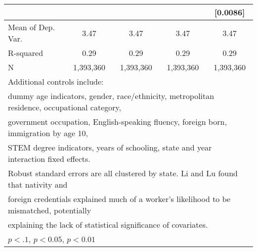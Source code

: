 \begin{table}[htbp]
\begin{tabular}{l*{4}{c}}
                    &                     &                     &                     &    [0.0086]         \\
\midrule
Mean of Dep. Var.   &        3.47         &        3.47         &        3.47         &        3.47         \\
R-squared           &        0.29         &        0.29         &        0.29         &        0.29         \\
N                   &   1,393,360         &   1,393,360         &   1,393,360         &   1,393,360         \\
\bottomrule
\multicolumn{5}{l}{\footnotesize Additional controls include:}\\
\multicolumn{5}{l}{\footnotesize dummy age indicators, gender, race/ethnicity, metropolitan residence, occupational category,}\\
\multicolumn{5}{l}{\footnotesize government occupation, English-speaking fluency, foreign born, immigration by age 10,}\\
\multicolumn{5}{l}{\footnotesize STEM degree indicators, years of schooling, state and year interaction fixed effects.}\\
\multicolumn{5}{l}{\footnotesize Robust standard errors are all clustered by state. Li and Lu found that nativity and}\\
\multicolumn{5}{l}{\footnotesize foreign credentials explained much of a worker's likelihood to be mismatched, potentially}\\
\multicolumn{5}{l}{\footnotesize explaining the lack of statistical significance of covariates.}\\
\multicolumn{5}{l}{\footnotesize \sym{*} \(p<.1\), \sym{**} \(p<0.05\), \sym{***} \(p<0.01\)}\\
\end{tabular}
\end{table}
